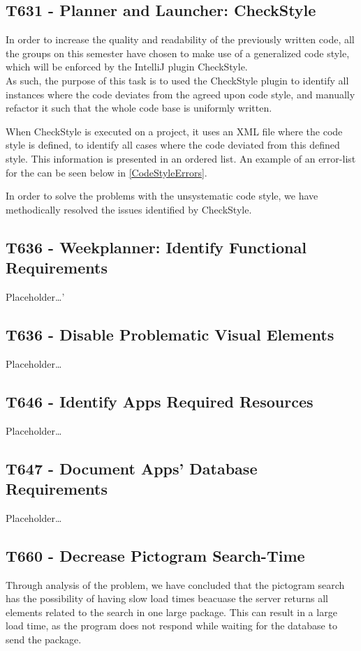 \subsection{T631 - Planner and Launcher: CheckStyle}
In order to increase the quality and readability of the previously written code,
all the groups on this semester have chosen to make use of a generalized code
style, which will be enforced by the IntelliJ plugin CheckStyle.\\
As such, the purpose of this task is to used the CheckStyle plugin to identify
all instances where the code deviates from the agreed upon code style, and
manually refactor it such that the whole code base is uniformly written.\nl

When CheckStyle is executed on a project, it uses an XML file where the code
style is defined, to identify all cases where the code deviated from this
defined style. This information is presented in an ordered list. An example of
an error-list for the  can be seen below in
\autoref{CodeStyleErrors}.


In order to solve the problems with the unsystematic code style, we have
methodically resolved the issues identified by CheckStyle.

\subsection{T636 - Weekplanner: Identify Functional Requirements}
Placeholder\ldots'


\subsection{T636 - Disable Problematic Visual Elements}
Placeholder\ldots

\subsection{T646 - Identify Apps Required Resources}
Placeholder\ldots

\subsection{T647 - Document Apps' Database Requirements}
Placeholder\ldots

\subsection{T660 - Decrease Pictogram Search-Time}
Through analysis of the problem, we have concluded that the pictogram search has
the possibility of having slow load times beacuase the server returns all
elements related to the search in one large package. This can result in a large
load time, as the program does not respond while waiting for the database to
send the package. \nl

